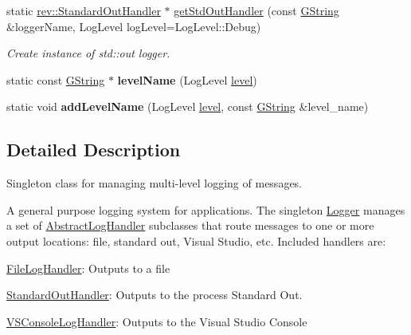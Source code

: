 \begin{Indent}
\begin{DoxyCompactItemize}
static \mbox{\hyperlink{classrev_1_1_standard_out_handler}{rev\+::\+Standard\+Out\+Handler}} $\ast$ \mbox{\hyperlink{classrev_1_1_logger_a99e447e259c0a0c97d98f7c2275ab4ae}{get\+Std\+Out\+Handler}} (const \mbox{\hyperlink{classrev_1_1_g_string}{G\+String}} \&logger\+Name, Log\+Level log\+Level=Log\+Level\+::\+Debug)
\begin{DoxyCompactList}\small\item\em Create instance of std\+::out logger. \end{DoxyCompactList}\item 
\mbox{\label{classrev_1_1_logger_a5967576165b2e3046a1eb9e5e611384b}} 
static const \mbox{\hyperlink{classrev_1_1_g_string}{G\+String}} $\ast$ {\bfseries level\+Name} (Log\+Level \mbox{\hyperlink{classrev_1_1_logger_a9fb93878a5b8e3e9367078a1446128b2}{level}})
\item 
\mbox{\label{classrev_1_1_logger_a3a3e4838f47d516d0e1391f999b7ecfb}} 
static void {\bfseries add\+Level\+Name} (Log\+Level \mbox{\hyperlink{classrev_1_1_logger_a9fb93878a5b8e3e9367078a1446128b2}{level}}, const \mbox{\hyperlink{classrev_1_1_g_string}{G\+String}} \&level\+\_\+name)
\end{DoxyCompactItemize}
\end{Indent}


\subsection{Detailed Description}
Singleton class for managing multi-\/level logging of messages. 

A general purpose logging system for applications. The singleton \mbox{\hyperlink{classrev_1_1_logger}{Logger}} manages a set of \mbox{\hyperlink{classrev_1_1_abstract_log_handler}{Abstract\+Log\+Handler}} subclasses that route messages to one or more output locations\+: file, standard out, Visual Studio, etc. Included handlers are\+:


\begin{DoxyItemize}
\item \mbox{\hyperlink{classrev_1_1_file_log_handler}{File\+Log\+Handler}}\+: Outputs to a file
\item \mbox{\hyperlink{classrev_1_1_standard_out_handler}{Standard\+Out\+Handler}}\+: Outputs to the process Standard Out.
\item \mbox{\hyperlink{classrev_1_1_v_s_console_log_handler}{V\+S\+Console\+Log\+Handler}}\+: Outputs to the Visual Studio Console
\end{DoxyItemize}

